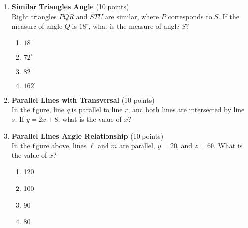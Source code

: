 \begin{enumerate}
  \newpage

  \item \textbf{Similar Triangles Angle} (10 points)\\
  Right triangles $PQR$ and $STU$ are similar, where $P$ corresponds to $S$. If the measure of angle $Q$ is $18^{\circ}$, what is the measure of angle $S$?
  \begin{enumerate}[label=(\Alph*)]
    \item $18^{\circ}$
    \item $72^{\circ}$
    \item $82^{\circ}$
    \item $162^{\circ}$
  \end{enumerate}
  \begin{subanswer}
  \end{subanswer}

  \item \textbf{Parallel Lines with Transversal} (10 points)\\
  In the figure, line $q$ is parallel to line $r$, and both lines are intersected by line $s$. If $y=2x+8$, what is the value of $x$?
  \begin{subanswer}
  \end{subanswer}

  \newpage

  \item \textbf{Parallel Lines Angle Relationship} (10 points)\\
  In the figure above, lines $\ell$ and $m$ are parallel, $y=20$, and $z=60$. What is the value of $x$?
  \begin{enumerate}[label=(\Alph*)]
    \item 120
    \item 100
    \item 90
    \item 80
  \end{enumerate}
  \begin{subanswer}
  \end{subanswer}


\end{enumerate}
